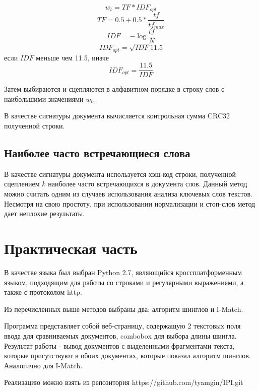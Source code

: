 \documentclass[a4paper,12pt,oneside]{article}
\begin{document}
\begin{equation} w_t = TF * IDF_{opt} \end{equation}
\begin{equation} TF = 0.5 + 0.5 * \frac{tf}{tf_{max}} \end{equation}
\begin{equation} IDF = -\log{\frac{tf}{N}} \end{equation}
\begin{equation} IDF_{opt} = \sqrt{IDF}{11.5} \end{equation}
если $IDF$ меньше чем 11.5, иначе
\begin{equation} IDF_{opt} = \frac{11.5}{IDF} \end{equation}

Затем выбираются и сцепляются в алфавитном порядке в строку слов с наибольшими значениями $ w_t $.

В качестве сигнатуры документа вычисляется контрольная сумма CRC32 полученной строки.

\subsection{Наиболее часто встречающиеся слова}
В качестве сигнатуры документа используется хэш-код строки, полученной сцеплением $k$ наиболее часто встречающихся в документа слов. Данный метод можно считать одним из случаев использования анализа ключевых слов текстов. Несмотря на свою простоту, при использовании нормализации и стоп-слов метод дает неплохие результаты.


\section{Практическая часть}
В качестве языка был выбран Python 2.7, являющийся кроссплатформенным языком, подходящим для работы со строками и регулярными выражениями, а также с протоколом http.

Из перечисленных выше методов выбраны два: алгоритм шинглов и I-Match.

Программа представляет собой веб-страницу, содержащую 2 текстовых поля ввода для сравниваемых документов, combobox для выбора длины шингла. Результат работы - вывод документов с выделенными фрагментами текста, которые присутствуют в обоих документах, которые показал алгоритм шинглов. Аналогично для I-Match.

Реализацию можно взять из репозитория https://github.com/tyamgin/IPI.git
\end{document}
